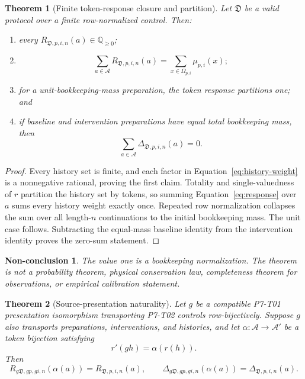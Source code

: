 \documentclass[11pt]{article}
\newtheorem{theorem}{Theorem}
\newtheorem{nonconclusion}{Non-conclusion}
\newcommand{\Device}{\mathfrak D}
\newcommand{\Tokens}{\mathcal A}
\newcommand{\Response}{R}
\newcommand{\Difference}{\Delta}
\begin{document}
\begin{theorem}[Finite token-response closure and partition]
\label{thm:partition}
Let \(\Device\) be a valid protocol over a finite row-normalized control.
Then:
\begin{enumerate}[leftmargin=*]
\item every
  \(\Response_{\Device,p,i,n}(a)\in\mathbb Q_{\geq0}\);
\item
  \[
    \sum_{a\in\Tokens}\Response_{\Device,p,i,n}(a)
    =
    \sum_{x\in\Omega_{p,i}}\mu_{p,i}(x);
  \]
\item for a unit-bookkeeping-mass preparation, the token response partitions
  one; and
\item if baseline and intervention preparations have equal total
  bookkeeping mass, then
  \[
    \sum_{a\in\Tokens}\Difference_{\Device,p,i,n}(a)=0.
  \]
\end{enumerate}
\end{theorem}

\begin{proof}
Every history set is finite, and each factor in
Equation~\eqref{eq:history-weight} is a nonnegative rational, proving the
first claim. Totality and single-valuedness of \(r\) partition the history
set by tokens, so summing Equation~\eqref{eq:response} over \(a\) sums every
history weight exactly once. Repeated row normalization collapses the sum
over all length-\(n\) continuations to the initial bookkeeping mass. The unit
case follows. Subtracting the equal-mass baseline identity from the
intervention identity proves the zero-sum statement.
\end{proof}

\begin{nonconclusion}
The value one is a bookkeeping normalization. The theorem is not a
probability theorem, physical conservation law, completeness theorem for
observations, or empirical calibration statement.
\end{nonconclusion}

\begin{theorem}[Source-presentation naturality]
\label{thm:naturality}
Let \(g\) be a compatible P7-T01 presentation isomorphism transporting
P7-T02 controls row-bijectively. Suppose \(g\) also transports preparations,
interventions, and histories, and let
\(\alpha:\Tokens\to\Tokens'\) be a token bijection satisfying
\[
  r'(gh)=\alpha(r(h)).
\]
Then
\begin{equation}
  \Response_{g\Device,gp,gi,n}(\alpha(a))
  =
  \Response_{\Device,p,i,n}(a),
  \qquad
  \Difference_{g\Device,gp,gi,n}(\alpha(a))
  =
  \Difference_{\Device,p,i,n}(a).
  \label{eq:naturality}
\end{equation}
\end{theorem}
\end{document}
